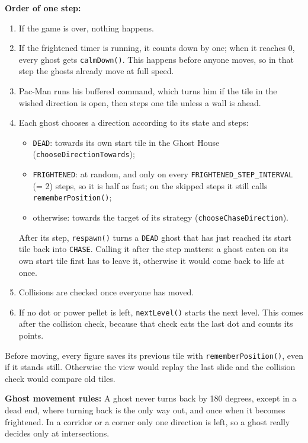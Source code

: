 \documentclass[11pt, a4paper]{article}
\begin{document}
\textbf{Order of one step:}
\begin{enumerate}
    \item If the game is over, nothing happens.
    \item If the frightened timer is running, it counts down by one; when it reaches 0, every ghost gets \texttt{calmDown()}. This happens before anyone moves, so in that step the ghosts already move at full speed.
    \item Pac-Man runs his buffered command, which turns him if the tile in the wished direction is open, then steps one tile unless a wall is ahead.
    \item Each ghost chooses a direction according to its state and steps:
    \begin{itemize}
        \item \texttt{DEAD}: towards its own start tile in the Ghost House (\texttt{chooseDirectionTowards});
        \item \texttt{FRIGHTENED}: at random, and only on every \texttt{FRIGHTENED\_STEP\_INTERVAL} (= 2) steps, so it is half as fast; on the skipped steps it still calls \texttt{rememberPosition()};
        \item otherwise: towards the target of its strategy (\texttt{chooseChaseDirection}).
    \end{itemize}
    After its step, \texttt{respawn()} turns a \texttt{DEAD} ghost that has just reached its start tile back into \texttt{CHASE}. Calling it after the step matters: a ghost eaten on its own start tile first has to leave it, otherwise it would come back to life at once.
    \item Collisions are checked once everyone has moved.
    \item If no dot or power pellet is left, \texttt{nextLevel()} starts the next level. This comes after the collision check, because that check eats the last dot and counts its points.
\end{enumerate}
Before moving, every figure saves its previous tile with \texttt{rememberPosition()}, even if it stands still. Otherwise the view would replay the last slide and the collision check would compare old tiles.

\textbf{Ghost movement rules:} A ghost never turns back by 180 degrees, except in a dead end, where turning back is the only way out, and once when it becomes frightened. In a corridor or a corner only one direction is left, so a ghost really decides only at intersections.
\end{document}
